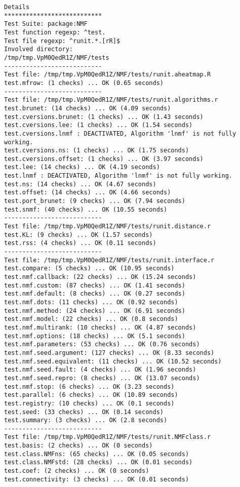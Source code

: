 \documentclass[10pt]{article}
\begin{document}
\begin{verbatim}
Details 
*************************** 
Test Suite: package:NMF 
Test function regexp: ^test. 
Test file regexp: ^runit.*.[rR]$ 
Involved directory: 
/tmp/tmp.VpM0QedR1Z/NMF/tests 
--------------------------- 
Test file: /tmp/tmp.VpM0QedR1Z/NMF/tests/runit.aheatmap.R 
test.mfrow: (1 checks) ... OK (0.65 seconds)
--------------------------- 
Test file: /tmp/tmp.VpM0QedR1Z/NMF/tests/runit.algorithms.r 
test.brunet: (14 checks) ... OK (4.09 seconds)
test.cversions.brunet: (1 checks) ... OK (1.43 seconds)
test.cversions.lee: (1 checks) ... OK (1.54 seconds)
test.cversions.lnmf : DEACTIVATED, Algorithm 'lnmf' is not fully working.
test.cversions.ns: (1 checks) ... OK (1.75 seconds)
test.cversions.offset: (1 checks) ... OK (3.97 seconds)
test.lee: (14 checks) ... OK (4.19 seconds)
test.lnmf : DEACTIVATED, Algorithm 'lnmf' is not fully working.
test.ns: (14 checks) ... OK (4.67 seconds)
test.offset: (14 checks) ... OK (4.66 seconds)
test.port_brunet: (9 checks) ... OK (7.94 seconds)
test.snmf: (40 checks) ... OK (10.55 seconds)
--------------------------- 
Test file: /tmp/tmp.VpM0QedR1Z/NMF/tests/runit.distance.r 
test.KL: (9 checks) ... OK (1.57 seconds)
test.rss: (4 checks) ... OK (0.11 seconds)
--------------------------- 
Test file: /tmp/tmp.VpM0QedR1Z/NMF/tests/runit.interface.r 
test.compare: (5 checks) ... OK (10.95 seconds)
test.nmf.callback: (22 checks) ... OK (15.24 seconds)
test.nmf.custom: (87 checks) ... OK (1.41 seconds)
test.nmf.default: (8 checks) ... OK (0.27 seconds)
test.nmf.dots: (11 checks) ... OK (0.92 seconds)
test.nmf.method: (24 checks) ... OK (6.91 seconds)
test.nmf.model: (22 checks) ... OK (0.8 seconds)
test.nmf.multirank: (10 checks) ... OK (4.87 seconds)
test.nmf.options: (18 checks) ... OK (5.1 seconds)
test.nmf.parameters: (53 checks) ... OK (0.76 seconds)
test.nmf.seed.argument: (127 checks) ... OK (8.33 seconds)
test.nmf.seed.equivalent: (11 checks) ... OK (10.52 seconds)
test.nmf.seed.fault: (4 checks) ... OK (1.96 seconds)
test.nmf.seed.repro: (8 checks) ... OK (13.07 seconds)
test.nmf.stop: (6 checks) ... OK (3.23 seconds)
test.parallel: (6 checks) ... OK (10.89 seconds)
test.registry: (10 checks) ... OK (0.1 seconds)
test.seed: (33 checks) ... OK (0.14 seconds)
test.summary: (3 checks) ... OK (2.8 seconds)
--------------------------- 
Test file: /tmp/tmp.VpM0QedR1Z/NMF/tests/runit.NMFclass.r 
test.basis: (2 checks) ... OK (0 seconds)
test.class.NMFns: (65 checks) ... OK (0.05 seconds)
test.class.NMFstd: (28 checks) ... OK (0.01 seconds)
test.coef: (2 checks) ... OK (0 seconds)
test.connectivity: (3 checks) ... OK (0.01 seconds)

\end{verbatim}
\end{document}
